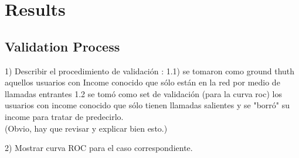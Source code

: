 \section{Results}

\subsection{Validation Process}

1) Describir el procedimiento de validación :
1.1) se tomaron como ground thuth aquellos usuarios con Income conocido que sólo están en la red por medio de llamadas entrantes
1.2 se tomó como set de validación (para la curva roc)  los usuarios con income conocido que sólo tienen llamadas salientes y se "borró" su income para tratar de predecirlo. \\

(Obvio, hay que revisar y explicar bien esto.)

2) Mostrar curva ROC para el caso correspondiente.
